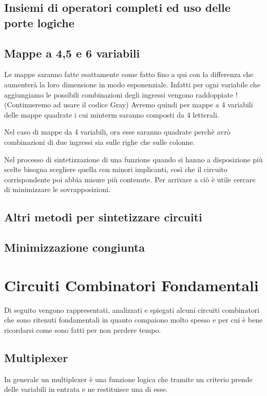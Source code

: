 \documentclass[a4paper]{book}
\begin{document}
\section{Insiemi di operatori completi ed uso delle porte logiche}

\section{Mappe a 4,5 e 6 variabili}
Le mappe saranno fatte esattamente come fatto fino a qui con la differenza che aumenterà la loro dimensione in modo esponenziale.
Infatti per ogni variabile che aggiungiamo le possibili combinazioni degli ingressi vengono raddoppiate !
(Continueremo ad usare il codice Gray)
Avremo quindi per mappe a 4 variabili delle mappe quadrate i cui minterm saranno composti da 4 letterali.

Nel caso di mappe da 4 variabili, ora esse saranno quadrate perchè avrò combinazioni di due ingressi sia sulle righe che sulle colonne.

Nel processo di sintetizzazione di una funzione quando si hanno a disposizione più scelte bisogna scegliere quella con minori implicanti, così che il circuito corrispondente poi abbia misure più contenute.
Per arrivare a ciò è utile cercare di minimizzare le sovrapposizioni.





\section{Altri metodi per sintetizzare circuiti}
\section{Minimizzazione congiunta}
\newpage	
\chapter{Circuiti Combinatori Fondamentali}

Di seguito vengono rappresentati, analizzati e spiegati alcuni circuiti combinatori che sono ritenuti fondamentali in quanto compaiono molto spesso e per cui è bene ricordarsi come sono fatti per non perdere tempo.
\section{Multiplexer}
In generale un multiplexer è una funzione logica che tramite un criterio prende delle variabili in entrata e ne restituisce una di esse.
\end{document}
